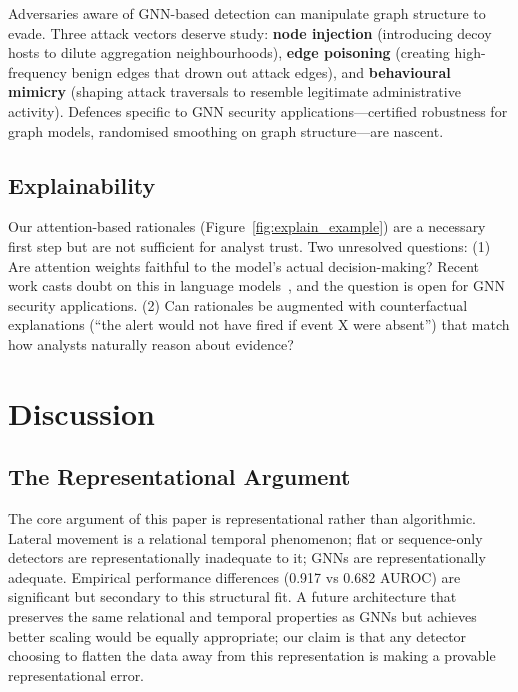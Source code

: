 \documentclass[sigconf,nonacm]{acmart}
\begin{document}
Adversaries aware of GNN-based detection can manipulate graph structure to
evade. Three attack vectors deserve study: \textbf{node injection}
(introducing decoy hosts to dilute aggregation neighbourhoods),
\textbf{edge poisoning} (creating high-frequency benign edges that drown out
attack edges), and \textbf{behavioural mimicry} (shaping attack traversals
to resemble legitimate administrative activity). Defences specific to GNN
security applications---certified robustness for graph models, randomised
smoothing on graph structure---are nascent.

\subsection{Explainability}

Our attention-based rationales (Figure~\ref{fig:explain_example}) are a
necessary first step but are not sufficient for analyst trust. Two unresolved
questions: (1) Are attention weights faithful to the model's actual
decision-making? Recent work casts doubt on this in language
models~\cite{jain2019attention}, and the question is open for GNN security
applications. (2) Can rationales be augmented with counterfactual
explanations (``the alert would not have fired if event X were absent'')
that match how analysts naturally reason about evidence?

\section{Discussion}

\subsection{The Representational Argument}

The core argument of this paper is representational rather than algorithmic.
Lateral movement is a relational temporal phenomenon; flat or sequence-only
detectors are representationally inadequate to it; GNNs are representationally
adequate. Empirical performance differences (0.917 vs 0.682 AUROC) are
significant but secondary to this structural fit. A future architecture that
preserves the same relational and temporal properties as GNNs but achieves
better scaling would be equally appropriate; our claim is that any detector
choosing to flatten the data away from this representation is making a
provable representational error.
\end{document}
